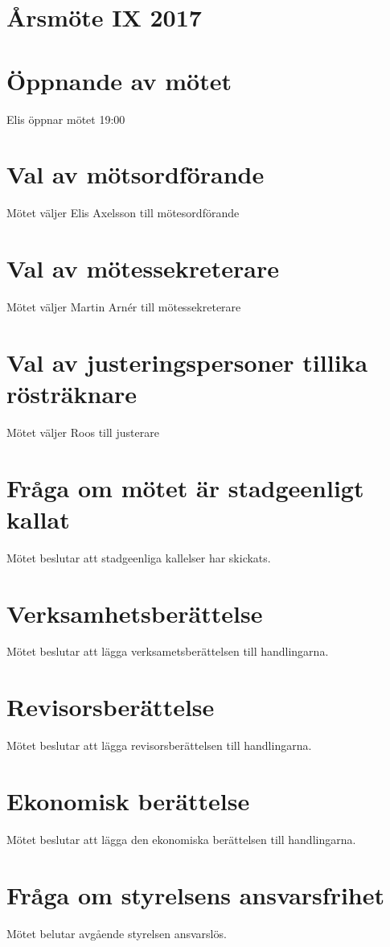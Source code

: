 \documentclass[a4paper,11pt,oneside]{article}
\begin{document}
\section*{Årsmöte IX 2017}

\section{Öppnande av mötet}
Elis öppnar mötet 19:00

\section{Val av mötsordförande}
Mötet väljer Elis Axelsson till mötesordförande

\section{Val av mötessekreterare}
Mötet väljer Martin Arnér till mötessekreterare

\section{Val av justeringspersoner tillika rösträknare}
Mötet väljer Roos till justerare

\section{Fråga om mötet är stadgeenligt kallat}
Mötet beslutar att stadgeenliga kallelser har skickats.

\section{Verksamhetsberättelse}
Mötet beslutar att lägga verksametsberättelsen till handlingarna.

\section{Revisorsberättelse}
Mötet beslutar att lägga revisorsberättelsen till handlingarna.

\section{Ekonomisk berättelse}
Mötet beslutar att lägga den ekonomiska berättelsen till handlingarna.

\section{Fråga om styrelsens ansvarsfrihet}
Mötet belutar avgående styrelsen ansvarslös.
\end{document}
